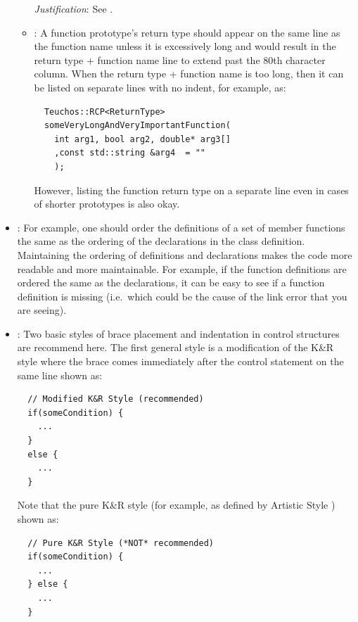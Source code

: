\begin{itemize}
\begin{itemize}
  {}\textit{Justification}: See {}\cite[Section 31.1]{CodeComplete2nd04}.
  
  {}\item\FSCFunctionReturn: A function prototype's return type should appear
  on the same line as the function name unless it is excessively long and
  would result in the return type + function name line to extend past the 80th
  character column.  When the return type + function name is too long, then it
  can be listed on separate lines with no indent, for example, as:
  
  {\small\begin{verbatim}
  Teuchos::RCP<ReturnType>
  someVeryLongAndVeryImportantFunction(
    int arg1, bool arg2, double* arg3[]
    ,const std::string &arg4  = ""
    );
  \end{verbatim}}

  However, listing the function return type on a separate line even in cases
  of shorter prototypes is also okay.

  \end{itemize}

{}\item\FSCOrderFunctionDefinitions: For example, one should order the
definitions of a set of member functions the same as the ordering of the
declarations in the class definition.  Maintaining the ordering of definitions
and declarations makes the code more readable and more maintainable.  For
example, if the function definitions are ordered the same as the declarations,
it can be easy to see if a function definition is missing (i.e.\ which could
be the cause of the link error that you are seeing).

{}\item\FSCBracePlacement: Two basic styles of brace placement and indentation
in control structures are recommend here.  The first general style is a
modification of the K\&R style{}\cite{ArtisticStyle} where the brace comes
immediately after the control statement on the same line shown as:

{\small\begin{verbatim}
  // Modified K&R Style (recommended)
  if(someCondition) {
    ...
  }
  else {
    ...
  }
\end{verbatim}}

Note that the pure K\&R style (for example, as defined by Artistic Style
{}\cite{ArtisticStyle}) shown as:

{\small\begin{verbatim}
  // Pure K&R Style (*NOT* recommended)
  if(someCondition) {
    ...
  } else {
    ...
  }
\end{verbatim}}


\end{itemize}
